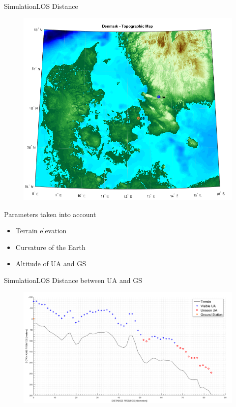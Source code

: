 \begin{frame}{Simulation}{LOS Distance}
  \begin{figure}
    \includegraphics[scale=0.25]{../report/figures/gs_ua_map.png}
  \end{figure}
  \begin{block}{Parameters taken into account}
	\begin{itemize}
	 	\item Terrain elevation
	  	\item Curvature of the Earth
	  	\item Altitude of UA and GS
	\end{itemize}
  \end{block}
\end{frame}

\begin{frame}{Simulation}{LOS Distance between UA and GS} 
  	\begin{figure}
        \includegraphics[scale=0.29]{../report/figures/los_2points.png}
    \end{figure}
\end{frame}

